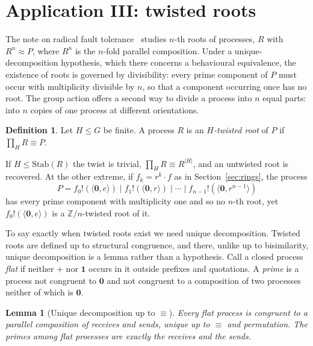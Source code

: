 \documentclass[11pt]{article}
\newtheorem{lemma}[theorem]{Lemma}
\theoremstyle{definition}
\newtheorem{definition}[theorem]{Definition}
\theoremstyle{remark}
\newcommand{\nil}{\mathbf{0}}
\newcommand{\chaos}{\mathbf{1}}
\newcommand{\out}[3]{#1!(\langle #2, #3\rangle)}
\newcommand{\act}[2]{#1\cdot #2}
\newcommand{\scong}{\equiv}
\newcommand{\Stab}{\mathrm{Stab}}
\begin{document}
\section{Application III: twisted roots}\label{sec:roots}

The note on radical fault tolerance~\cite{rft} studies $n$-th roots of
processes, $R$ with $R^n\approx P$, where $R^n$ is the $n$-fold parallel
composition. Under a unique-decomposition hypothesis, which there concerns a
behavioural equivalence, the existence of roots is governed by divisibility: every prime component of $P$ must occur with
multiplicity divisible by $n$, so that a component occurring once has no
root. The group action offers a second way to divide a process into $n$ equal
parts: into $n$ copies of one process at different orientations.

\begin{definition}
Let $H\le G$ be finite. A process $R$ is an \emph{$H$-twisted root} of $P$ if
$\prod_H R\scong P$.
\end{definition}

If $H\le\Stab(R)$ the twist is trivial, $\prod_H R\scong R^{|H|}$, and an
untwisted root is recovered. At the other extreme, if $f_k=\act{r^k}{f}$ as in
Section~\ref{sec:rings}, the process
\[
P=\out{f_0}{\nil}{e}\mid\out{f_1}{\nil}{r}\mid\cdots\mid
\out{f_{n-1}}{\nil}{r^{n-1}}
\]
has every prime component with multiplicity one and so no $n$-th root, yet
$\out{f_0}{\nil}{e}$ is a $\mathbb{Z}/n$-twisted root of it.

To say exactly when twisted roots exist we need unique decomposition. Twisted
roots are defined up to structural congruence, and there, unlike up to
bisimilarity, unique decomposition is a lemma rather than a hypothesis. Call a
closed process \emph{flat} if neither $+$ nor $\chaos$ occurs in it outside
prefixes and quotations. A \emph{prime} is a process not congruent to $\nil$
and not congruent to a composition of two processes neither of which is
$\nil$.

\begin{lemma}[Unique decomposition up to $\scong$]\label{lem:upd}
Every flat process is congruent to a parallel composition of receives and
sends, unique up to $\scong$ and permutation. The primes among flat processes
are exactly the receives and the sends.
\end{lemma}
\end{document}
